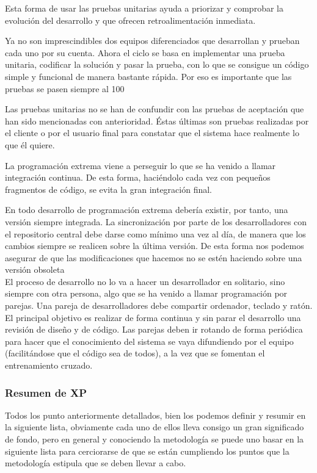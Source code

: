 \documentclass[12pt]{book} %
\begin{document}
			Esta forma de usar las pruebas unitarias ayuda a priorizar y comprobar la evolución del desarrollo y que ofrecen retroalimentación 
			inmediata.
			
			Ya no son imprescindibles dos equipos diferenciados que desarrollan y prueban cada uno por su cuenta. Ahora el ciclo se basa en 
			implementar una prueba unitaria, codificar la solución y pasar la prueba, con lo que se consigue un código simple y funcional de manera
			bastante rápida. Por eso es importante que las pruebas se pasen siempre al 100%
			 
			Las pruebas unitarias no se han de confundir con las pruebas de aceptación que han sido mencionadas con anterioridad. Éstas últimas son
			pruebas realizadas por el cliente o por el usuario final para constatar que el sistema hace realmente lo que él quiere.
			
			La programación extrema viene a perseguir lo que se ha venido a llamar integración continua. De esta forma, haciéndolo cada vez con 
			pequeños fragmentos de código, se evita la gran integración final. 
			
			En todo desarrollo de programación extrema debería existir, por tanto, una versión siempre integrada. La sincronización por parte de los
			desarrolladores con el repositorio central debe darse como mínimo una vez al día, de manera que los cambios siempre se realicen sobre 
			la última versión. De esta forma nos podemos asegurar de que las modificaciones que hacemos no se estén haciendo sobre una versión 
			obsoleta\\
			
			El proceso de desarrollo no lo va a hacer un desarrollador en solitario, sino siempre con otra persona, algo que se ha venido a llamar
			programación por parejas. Una pareja de desarrolladores debe compartir ordenador, teclado y ratón. El principal objetivo es realizar de 
			forma continua y sin parar el desarrollo una revisión de diseño y de código. Las parejas deben ir rotando de forma periódica para hacer 
			que el conocimiento del sistema se vaya difundiendo por el equipo (facilitándose que el código sea de todos), a la vez que se fomentan 
			el entrenamiento cruzado.
			
		\subsubsection{Resumen de XP}
			Todos los punto anteriormente detallados, bien los podemos definir y resumir en la siguiente lista, obviamente cada uno de ellos
			lleva consigo un gran significado de fondo, pero en general  y conociendo la metodología se puede uno basar en la siguiente lista 
			para cerciorarse de que se están cumpliendo los puntos que la metodología estipula que se deben llevar a cabo.
			
\end{document}
